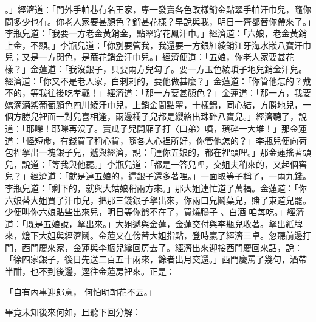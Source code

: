 。」經濟道：「門外手帕巷有名王家，專一發賣各色改樣銷金點翠手帕汗巾兒，隨你問多少也有。你老人家要甚顏色？銷甚花樣？早說與我，明日一齊都替你帶來了。」李瓶兒道：「我要一方老金黃銷金，點翠穿花鳳汗巾。」經濟道：「六娘，老金黃銷上金，不顯。」李瓶兒道：「你別要管我，我還要一方銀紅綾銷江牙海水嵌八寶汗巾兒；又是一方閃色，是蔴花銷金汗巾兒。」經濟便道：「五娘，你老人家要甚花樣？」金蓮道：「我沒銀子，只要兩方兒勾了。要一方玉色綾瑣子地兒銷金汗兒。經濟道：「你又不是老人家，白剌剌的，要他做甚麼？」金蓮道：「你管他怎的？戴不的，等我往後吃孝戴！」經濟道：「那一方要甚顏色？」金蓮道：「那一方，我要嬌滴滴紫葡萄顏色四川綾汗巾兒，上銷金間點翠，十樣錦，同心結，方勝地兒，一個方勝兒裡面一對兒喜相逢，兩邊欄子兒都是纓絡出珠碎八寶兒。」經濟聽了，說道：「耶嚛！耶嚛再沒了。賣瓜子兒開廂子打〈口弟〉噴，瑣碎一大堆！」那金蓮道：「怪短命，有錢買了稱心貨，隨各人心裡所好，你管他怎的？」李瓶兒便向荷包裡拏出一塊銀子兒，遞與經濟，說：「連你五娘的，都在裡頭哩。」那金蓮搖著頭兒，說道：「等我與他罷。」李瓶兒道：「都是一答兒哩，交姐夫稍來的，又起個窖兒？」經濟道：「就是連五娘的，這銀子還多著哩。」一面取等子稱了，一兩九錢。李瓶兒道：「剩下的，就與大姑娘稍兩方來。」那大姐連忙道了萬福。金蓮道：「你六娘替大姐買了汗巾兒，把那三錢銀子拏出來，你兩口兒鬬葉兒，賭了東道兒罷。少便叫你六娘貼些出來兒，明日等你爺不在了，買燒鴨子 、白酒 咱每吃。」經濟道：「既是五娘說，拏出來。」大姐遞與金蓮，金蓮交付與李瓶兒收著。拏出紙牌來，燈下大姐與經濟鬬。金蓮又在傍替大姐指點，登時嬴了經濟三卓。忽聽前邊打門，西門慶來家，金蓮與李瓶兒纔回房去了。經濟出來迎接西門慶回來話，說：「徐四家銀子，後日先送二百五十兩來，餘者出月交還。」西門慶罵了幾句，酒帶半酣，也不到後邊，逕往金蓮房裡來。正是：

「自有內事迎郎意，  何怕明朝花不云。」

畢竟未知後來何如，且聽下回分解：
